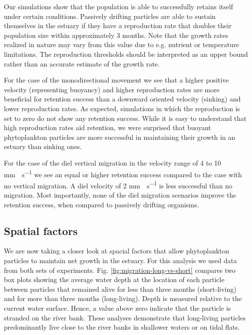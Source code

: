 \documentclass[npg, manuscript]{copernicus}
\begin{document}
Our simulations show that the population is able to successfully retains itself under certain conditions.
Passively drifting particles are able to sustain themselves in the estuary if they have a reproduction rate that doubles their population size within approximately 3 months.
Note that the growth rates realized in nature may vary from this value due to e.g. nutrient or temperature limitations. The reproduction thresholds should be interpreted as an upper bound rather than an accurate estimate of the growth rate.

For the case of the monodirectional movement we see that a higher positive velocity (representing buoyancy) and higher reproduction rates are more beneficial for retention success than a downward oriented velocity (sinking) and lower reproduction rates.
As expected, simulations in which the reproduction is set to zero do not show any retention success.
While it is easy to understand that high reproduction rates aid retention, we were surprised that buoyant phytoplankton particles are more successful in maintaining their growth in an estuary than sinking ones.

For the case of the diel vertical migration in the velocity range of 4 to 10 \unit{mm\;s^{-1}} we see an equal or higher retention success compared to the case with no vertical migration.
A diel velocity of 2 \unit{mm\;s^{-1}} is less successful than no migration.
Most importantly, none of the diel migration scenarios improve the retention success, when compared to passively drifting organisms.


\subsection{Spatial factors}

We are now taking a closer look at spacial factors that allow phytoplankton particles to maintain net growth in the estuary. 
For this analysis we used data from both sets of experiments.
Fig. \ref{fig:migration-long-vs-short} compares two box plots showing the average water depth at the location of each particle between particles that remained alive for less than three months (short-living) and for more than three months (long-living).
Depth is measured relative to the current water surface.
Hence, a value above zero indicate that the particle is stranded on the river bank.
These analyses demonstrate that long-living particles predominantly live close to the river banks in shallower waters or on tidal flats.
\end{document}
